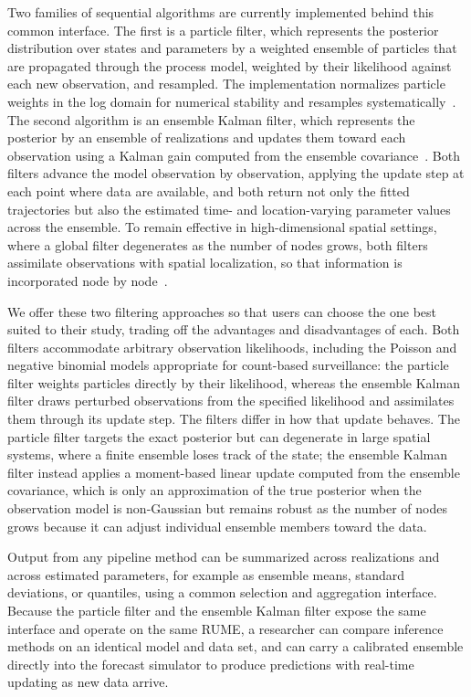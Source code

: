 Two families of sequential algorithms are currently implemented behind this common
interface. The first is a particle filter, which represents the posterior distribution over
states and parameters by a weighted ensemble of particles that are propagated through the
process model, weighted by their likelihood against each new observation, and resampled. The
implementation normalizes particle weights in the log domain for numerical stability and
resamples systematically~\citep{gordon_novel_1993,arulampalam_tutorial_2002}. The second algorithm is an ensemble Kalman filter, which
represents the posterior by an ensemble of realizations and updates them toward each
observation using a Kalman gain computed from the ensemble covariance~\citep{evensen_ensemble_2003}. Both filters
advance the model observation by observation, applying the update step at each point where
data are available, and both return not only the fitted trajectories but also the estimated
time- and location-varying parameter values across the ensemble. To remain effective in
high-dimensional spatial settings, where a global filter degenerates as the number of nodes
grows, both filters assimilate observations with spatial localization, so that information
is incorporated node by node~\citep{ionides_iterated_2024}.

We offer these two filtering approaches so that users can choose the one best suited to
their study, trading off the advantages and disadvantages of each. Both filters accommodate
arbitrary observation likelihoods, including the Poisson and negative binomial models
appropriate for count-based surveillance: the particle filter weights particles directly by
their likelihood, whereas the ensemble Kalman filter draws perturbed observations from the
specified likelihood and assimilates them through its update step. The filters differ in how
that update behaves. The particle filter targets the exact posterior but can degenerate in
large spatial systems, where a finite ensemble loses track of the state; the ensemble Kalman
filter instead applies a moment-based linear update computed from the ensemble covariance,
which is only an approximation of the true posterior when the observation model is
non-Gaussian but remains robust as the number of nodes grows because it can adjust
individual ensemble members toward the data.

Output from any pipeline method can be summarized across realizations and across estimated
parameters, for example as ensemble means, standard deviations, or quantiles, using a common
selection and aggregation interface. Because the particle filter and the ensemble Kalman
filter expose the same interface and operate on the same RUME, a researcher can compare
inference methods on an identical model and data set, and can carry a calibrated ensemble
directly into the forecast simulator to produce predictions with real-time updating as new
data arrive.

